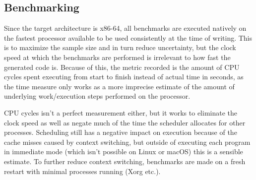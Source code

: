 \documentclass{article}
\begin{document}






\subsection{Benchmarking}


Since the target architecture is x86-64, all benchmarks are executed natively on the fastest processor available to be used consistently at the time of writing. This is to maximize the sample size and in turn reduce uncertainty, but the clock speed at which the benchmarks are performed is irrelevant to how fast the generated code is. Because of this, the metric recorded is the amount of CPU cycles spent executing from start to finish instead of actual time in seconds, as the time measure only works as a more imprecise estimate of the amount of underlying work/execution steps performed on the processor.

CPU cycles isn't a perfect measurement either, but it works to eliminate the clock speed as well as negate much of the time the scheduler allocates for other processes. Scheduling still has a negative impact on execution because of the cache misses caused by context switching, but outside of executing each program in immediate mode (which isn't possible on Linux or macOS) this is a sensible estimate. To further reduce context switching, benchmarks are made on a fresh restart with minimal processes running (Xorg etc.).
\end{document}
